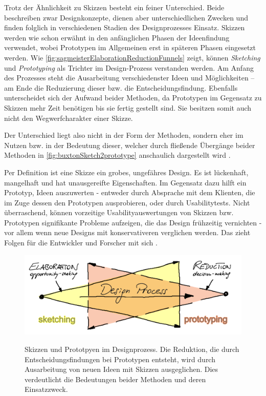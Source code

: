 \medskip Trotz der Ähnlichkeit zu Skizzen besteht ein feiner Unterschied. Beide beschreiben zwar Designkonzepte, dienen aber unterschiedlichen Zwecken und finden folglich in verschiedenen Stadien des Designprozesses Einsatz. Skizzen werden wie schon erwähnt in den anfänglichen Phasen	der	Ideenfindung verwendet, wobei Prototypen im	Allgemeinen	erst in späteren Phasen eingesetzt werden. Wie \autoref{fig:sagmeisterElaborationReductionFunnels} zeigt, können \emph{Sketching} und \emph{Prototyping} als Trichter im Design-Prozess verstanden werden. Am Anfang des Prozesses steht die Ausarbeitung verschiedenster Ideen und Möglichkeiten – am Ende die Reduzierung dieser bzw. die Entscheidungsfindung.
Ebenfalls unterscheidet sich der Aufwand beider Methoden, da Prototypen im Gegensatz zu Skizzen mehr Zeit benötigen bis sie fertig gestellt sind. Sie besitzen somit auch nicht den Wegwerfcharakter einer Skizze. 

Der Unterschied liegt also nicht in	der	Form der Methoden, sondern eher im Nutzen bzw. in der Bedeutung dieser,	welcher	durch fließende Übergänge beider Methoden in \autoref{fig:buxtonSketch2prototype} anschaulich dargestellt wird \citep{Sagmeister:2008}.

\medskip Per Definition ist eine Skizze ein grobes, ungefähres Design. Es ist lückenhaft, mangelhaft und hat unausgereifte Eigenschaften. Im Gegensatz dazu hilft ein Prototyp, Ideen auszuwerten - entweder durch Absprache mit dem Klienten, die im Zuge dessen den Prototypen ausprobieren, oder durch Usabilitytests. Nicht überraschend, können vorzeitige Usabilityauswertungen von Skizzen bzw. Prototypen signifikante Probleme aufzeigen, die das Design frühzeitig vernichten - vor allem wenn neue Designs mit konservativeren verglichen werden. Das zieht Folgen für die Entwickler und Forscher mit sich \citep{Greenberg:2008}.
	
\begin{figure}
	\begin{center}
        {\includegraphics[width=\linewidth]{gfx/sagmeisterElaborationReductionFunnels}}
	\end{center}
		\caption[Skizzen und Prototpyen im Designprozess. \newline \citep{Sagmeister:2008}]{Skizzen und Prototpyen im Designprozess. Die Reduktion, die durch Entscheidungsfindungen bei Prototypen entsteht, wird durch Ausarbeitung von neuen Ideen mit Skizzen ausgeglichen. Dies verdeutlicht die Bedeutungen beider Methoden und deren Einsatzzweck.}\label{fig:sagmeisterElaborationReductionFunnels}
\end{figure}


